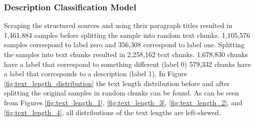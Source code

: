 \documentclass[a4paper, 12pt, oneside]{book} %
\begin{document}
\subsubsection{Description Classification Model} \label{par:results_binary_classifier}
Scraping the structured sources and using their paragraph titles resulted in 1,461,884 samples before splitting the sample into random text chunks.
1,105,576 samples correspond to label zero and 356,308 correspond to label one.
Splitting the samples into text chunks resulted in 2,258,162 text chunks.
1,678,830 chunks have a label that correspond to something different (label 0) 579,332 chunks have a label that corresponds to a description (label 1).
In Figure \ref{fig:text_length_distribution} the text length distribution before and after splitting the original samples in random chunks can be found.
As can be seen from Figures \ref{fig:text_length_1}, \ref{fig:text_length_3}, \ref{fig:text_length_2}, and \ref{fig:text_length_4}, all distributions of the text lengths are left-skewed. 
\end{document}
